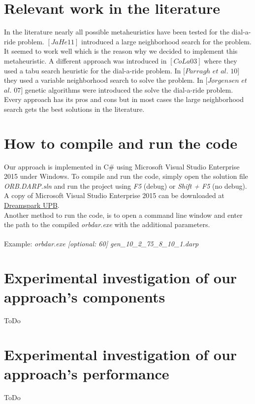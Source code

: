 \documentclass[fleqn]{scrartcl}
\begin{document}
\section{Relevant work in the literature}
In the literature nearly all possible metaheuristics have been tested for the dial-a-ride problem. 
$[JaHe 11]$ introduced a large neighborhood search for the problem. It seemed to work well which is the reason why we decided to implement this metaheuristic. A different approach was introduced in $[CoLa 03]$ where they used a tabu search heuristic for the dial-a-ride problem. In $[Parragh$  $et$  $al.$ $10]$ they used a variable neighborhood search to solve the problem. In $[Jørgensen$ $et$ $al.$ $07]$ genetic algorithms were introduced the solve the dial-a-ride problem.
Every approach has its pros and cons but in most cases the large neighborhood search gets the best solutions in the literature.

\section{How to compile and run the code}
Our approach is implemented in C\# using Microsoft Visual Studio Enterprise 2015 under Windows. To compile and run the code, simply open the solution file \textit{ORB.DARP.sln} and run the project using \textit{F5} (debug) or \textit{Shift + F5} (no debug). A copy of Microsoft Visual Studio Enterprise 2015 can be downloaded at \href{https://dreamspark.uni-paderborn.de/}{Dreamspark UPB}.
\\
Another method to run the code, is to open a command line window and enter the path to the compiled \textit{orbdar.exe} with the additional parameters.
\\\\
Example: \textit{orbdar.exe [optional: 60]  gen\_10\_2\_75\_8\_10\_1.darp}
\newpage

\section{Experimental investigation of our approach's components}
ToDo
\newpage

\section{Experimental investigation of our approach's performance}
ToDo
\newpage
\end{document}
